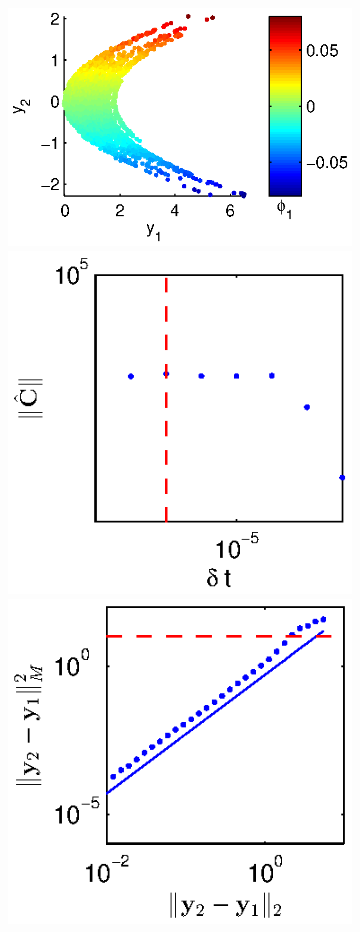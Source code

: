 \begin{figure}[t]
\begin{subfigure}{\textwidth}
\includegraphics[height=\figheight]{data_nonlinear_NIV_dt1_kernel2.eps}
\hfill
\includegraphics[height=\figheight]{C_dt_nonlinear_dt1_kernel2.eps}
\hfill
\includegraphics[height=\figheight]{dist_dy_nonlinear_dt1_kernel2.eps}
\end{subfigure}


\end{figure}

